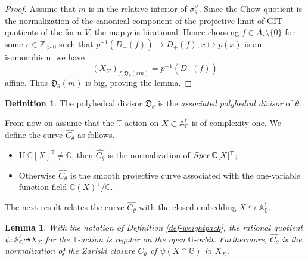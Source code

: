 \documentclass[11pt, reqno]{amsart}
\theoremstyle{plain}
\newtheorem{lemma}[theorem]{Lemma}
\theoremstyle{definition}
\newtheorem{definition}[theorem]{Definition}
\theoremstyle{remark}
\begin{document}
\begin{proof}
Assume that $m$ is in the relative interior of $\sigma_{\theta}^{\vee}$. Since the Chow quotient is the normalization 
of the canonical component of the projective limit of  GIT quotients of the form $V$, the map $p$ is birational. Hence choosing $f\in A_{r}\setminus\{0\}$ for some $r\in \mathbb{Z}_{>0}$ such that 
$p^{-1}(D_{+}(f))\rightarrow D_{+}(f), x\mapsto p(x) $
is an isomorphism,  we have $$(X_{\Sigma})_{f, \mathfrak{D}_{\theta}(rm)} =  p^{-1}(D_{+}(f))$$
affine. Thus $\mathfrak{D}_{\theta}(m)$ is big, proving the lemma. 
\end{proof}
\begin{definition}
The polyhedral divisor $\mathfrak{D}_{\theta}$ is the \emph{associated polyhedral divisor} of $\theta$. 
\end{definition}
From now on assume that the $\mathbb{T}$-action on $X\subset \mathbb{A}^{\ell}_{\mathbb{C}}$ is of complexity one.
We define the curve $\widehat{C_{\theta}}$
as follows.
\begin{itemize}
\item[$(1)$] If $\mathbb{C}[X]^{\mathbb{T}}\neq \mathbb{C}$, then $\widehat{C_{\theta}}$ is the normalization of ${\rm Spec}\, \mathbb{C}[X]^{\mathbb{T}}$;
\item[$(2)$] Otherwise $\widehat{C_{\theta}}$ is the smooth projective curve associated with the one-variable function field $\mathbb{C}(X)^{\mathbb{T}}/\mathbb{C}$. 
\end{itemize}
The next result relates the curve $\widehat{C_{\theta}}$ with the closed  embedding $X\hookrightarrow \mathbb{A}^{\ell}_{\mathbb{C}}$. 
\begin{lemma}\label{lem-Ctheta-Ctheta}
With the notation of Definition \ref{def-weightpack}, the rational quotient $\psi: \mathbb{A}_{\mathbb{C}}^{\ell}\dashrightarrow X_{\Sigma}$
for the $\mathbb{T}$-action is regular on the open $\mathbb{G}$-orbit. Furthermore, $\widehat{C_{\theta}}$ is the normalization of the Zariski closure $C_{\theta}$ of $\psi(X\cap \mathbb{G})$ in $X_{\Sigma}$. 
\end{lemma}
\end{document}
